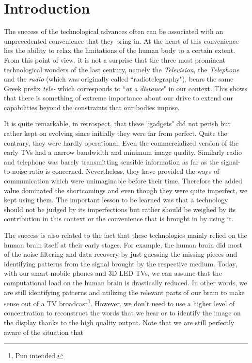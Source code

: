 \chapter{Introduction}
\label{chap:intro}

The success of the technological advances often can be associated with an unprecedented convenience that they bring in. At the heart of this convenience lies the ability to relax the limitations of the human body to a certain extent. From this point of view, it is not a surprise that the three most prominent technological wonders of the last century, namely the \emph{Television}, the \emph{Telephone} and the \emph{radio} (which was originally called ``radiotelegraphy"), bears the same Greek prefix \emph{tele-} which corresponds to ``\emph{at a distance}" in our context. This shows that there is something of extreme importance about our drive to extend our capabilities beyond the constraints that our bodies impose.


It is quite remarkable, in retrospect, that these ``gadgets" did not perish but rather kept on evolving since initially they were far from perfect. Quite the contrary, they were hardly operational. Even the commercialized version of the early TVs had a narrow bandwidth and minimum image quality. Similarly radio and telephone was barely transmitting sensible information as far as the signal-to-noise ratio is concerned. Nevertheless, they have provided the ways of communication which were unimaginable before their time. Therefore the added value dominated the shortcomings and even though they were quite imperfect, we kept using them. The important lesson to be learned was that a technology should not be judged by its imperfections but rather should be weighed by its contribution in this context or the convenience that is brought in by using it.  

The success is also related to the fact that these technologies mainly relied on the human brain itself at their early stages. For example, the human brain did most of the noise filtering and data recovery by just guessing the missing pieces and identifying patterns from the signal brought by the respective medium. Today, with our smart mobile phones and 3D LED TVs, we can assume that the computational load on the human brain is drastically reduced. In other words, we are still identifying patterns and utilizing the relevant parts of our brain to make sense out of a TV broadcast\footnote{Pun intended.}. However, we don't need to use a higher level of concentration to reconstruct the words that we hear or to identify the image on the display thanks to the high quality output. Note that we are still perfectly aware of the situation that 

